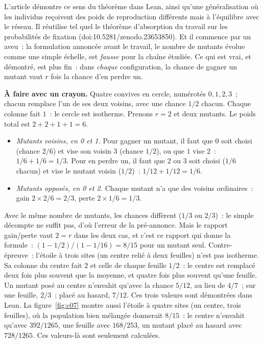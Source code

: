 L'article démontre ce sens du théorème dans Lean, ainsi qu'une généralisation où les individus reçoivent des
poids de reproduction différents mais \og à l'équilibre\fg{} avec le réseau. Il réutilise tel quel le théorème
d'absorption du travail sur les probabilités de fixation (doi:10.5281/zenodo.23653850). Et il commence par un aveu~: la formulation annoncée avant le travail, \og le
nombre de mutants évolue comme une simple échelle\fg, est \emph{fausse} pour la chaîne étudiée. Ce qui est vrai, et
démontré, est plus fin~: dans \emph{chaque} configuration, la chance de gagner un mutant vaut $r$ fois la chance
d'en perdre un.

\begin{encadre}
\textbf{À faire avec un crayon.} Quatre convives en cercle, numérotés $0,1,2,3$~; chacun remplace l'un de
ses deux voisins, avec une chance $1/2$ chacun. Chaque colonne fait $1$~: le cercle est isotherme. Prenons $r=2$ et
deux mutants. Le poids total est $2+2+1+1=6$.
\begin{itemize}
\item \emph{Mutants voisins, en 0 et 1.} Pour gagner un mutant, il faut que $0$ soit choisi (chance $2/6$) et vise
  son voisin $3$ (chance $1/2$), ou que $1$ vise $2$~: $1/6+1/6=1/3$. Pour en perdre un, il faut que $2$ ou $3$ soit
  choisi ($1/6$ chacun) et vise le mutant voisin ($1/2$)~: $1/12+1/12=1/6$.
\item \emph{Mutants opposés, en 0 et 2.} Chaque mutant n'a que des voisins ordinaires~: gain $2\times2/6=2/3$,
  perte $2\times1/6=1/3$.
\end{itemize}
Avec le même nombre de mutants, les chances diffèrent ($1/3$ ou $2/3$)~: le simple décompte ne suffit pas, d'où
l'erreur de la pré-annonce. Mais le rapport gain/perte vaut $2=r$ dans les deux cas, et c'est ce rapport qui donne
la formule~: $(1-1/2)/(1-1/16)=8/15$ pour un mutant seul. Contre-épreuve~: l'étoile à trois sites (un centre
relié à deux feuilles) n'est pas isotherme. Sa colonne du centre fait $2$ et celle de chaque feuille $1/2$~: le
centre est remplacé deux fois plus souvent que la moyenne, et quatre fois plus souvent qu'une feuille. Un mutant
posé au centre n'envahit qu'avec la chance $5/12$, au lieu de $4/7$~; sur une feuille, $2/3$~; placé au hasard,
$7/12$. Ces trois valeurs sont démontrées dans Lean. La figure~\ref{fig:c07} montre aussi l'étoile à quatre sites
(un centre, trois feuilles), où la population bien mélangée donnerait $8/15$~: le centre n'envahit qu'avec
$392/1265$, une feuille avec $168/253$, un mutant placé au hasard avec $728/1265$. Ces valeurs-là sont seulement
calculées.
\end{encadre}

